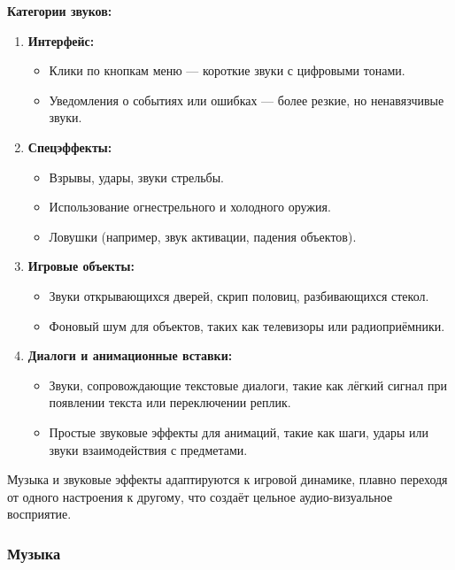 \documentclass[12pt]{article}
\begin{document}
        \textbf{Категории звуков:}
        \begin{enumerate}
            \item \textbf{Интерфейс:}
            \begin{itemize}
                \item Клики по кнопкам меню — короткие звуки с цифровыми тонами.
                \item Уведомления о событиях или ошибках — более резкие, но ненавязчивые звуки.
            \end{itemize}
    
            \item \textbf{Спецэффекты:}
            \begin{itemize}
                \item Взрывы, удары, звуки стрельбы.
                \item Использование огнестрельного и холодного оружия.
                \item Ловушки (например, звук активации, падения объектов).
            \end{itemize}
    
            \item \textbf{Игровые объекты:}
            \begin{itemize}
                \item Звуки открывающихся дверей, скрип половиц, разбивающихся стекол.
                \item Фоновый шум для объектов, таких как телевизоры или радиоприёмники.
            \end{itemize}
    
            \item \textbf{Диалоги и анимационные вставки:}
            \begin{itemize}
                \item Звуки, сопровождающие текстовые диалоги, такие как лёгкий сигнал при появлении текста или переключении реплик.
                \item Простые звуковые эффекты для анимаций, такие как шаги, удары или звуки взаимодействия с предметами.
            \end{itemize}
        \end{enumerate}
    
        Музыка и звуковые эффекты адаптируются к игровой динамике, плавно переходя от одного настроения к другому, что создаёт цельное аудио-визуальное восприятие.

        \subsubsection{Музыка}
\end{document}
